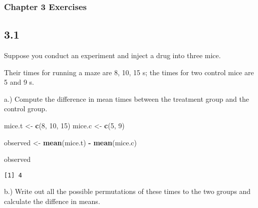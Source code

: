 \documentclass[
  12pt,
]{report}
\author{}
\date{\vspace{-2.5em}15 December, 2019}
\newenvironment{Shaded}{\begin{snugshade}}{\end{snugshade}}
\newcommand{\DecValTok}[1]{\textcolor[rgb]{0.00,0.00,0.81}{#1}}
\newcommand{\KeywordTok}[1]{\textcolor[rgb]{0.13,0.29,0.53}{\textbf{#1}}}
\newcommand{\NormalTok}[1]{#1}
\newcommand{\OperatorTok}[1]{\textcolor[rgb]{0.81,0.36,0.00}{\textbf{#1}}}
\newcommand{\StringTok}[1]{\textcolor[rgb]{0.31,0.60,0.02}{#1}}
\begin{document}
\hypertarget{chapter-3-exercises}{%
\subsubsection{Chapter 3 Exercises}\label{chapter-3-exercises}}

\hypertarget{section}{%
\subsection{3.1}\label{section}}

Suppose you conduct an experiment and inject a drug into three mice.

Their times for running a maze are 8, 10, 15 s; the times for two
control mice are 5 and 9 s.

a.) Compute the difference in mean times between the treatment group and
the control group.

\begin{Shaded}
\begin{Highlighting}[]
\NormalTok{mice.t <-}\StringTok{ }\KeywordTok{c}\NormalTok{(}\DecValTok{8}\NormalTok{, }\DecValTok{10}\NormalTok{, }\DecValTok{15}\NormalTok{)}
\NormalTok{mice.c <-}\StringTok{ }\KeywordTok{c}\NormalTok{(}\DecValTok{5}\NormalTok{, }\DecValTok{9}\NormalTok{)}

\NormalTok{observed <-}\StringTok{ }\KeywordTok{mean}\NormalTok{(mice.t) }\OperatorTok{-}\StringTok{ }\KeywordTok{mean}\NormalTok{(mice.c)}

\NormalTok{observed}
\end{Highlighting}
\end{Shaded}

\begin{verbatim}
[1] 4
\end{verbatim}

b.) Write out all the possible permutations of these times to the two
groups and calculate the diffence in means.
\end{document}
